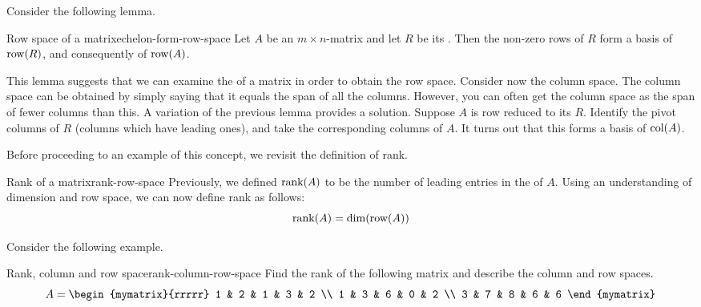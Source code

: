Consider the following lemma. 

\begin{lemma}{Row space of a {\ef} matrix}{echelon-form-row-space}
Let $A$ be an $m \times n$-matrix and let $R$ be its {\ef}. Then the non-zero rows of $R$ form a basis of $\mbox{\rm row}(R)$, and consequently of $\mbox{\rm row}(A)$. 
\end{lemma}

This lemma suggests that we can examine the {\ef} of a matrix in order to obtain the row space. Consider now the column space. The column space can be obtained by simply saying that
it equals the span of all the columns. However, you can often get the column
space as the span of fewer columns than this. A variation of the previous lemma provides a solution. Suppose $A$ is row reduced to its {\ef} $R$. Identify the pivot columns of $R$ (columns which have leading ones), and take the corresponding columns of $A$. It turns out that this forms a basis of $\mbox{\rm col}(A)$. 

Before proceeding to an example of this concept, we revisit the definition of rank. 

\begin{definition}{Rank of a matrix}{rank-row-space}
Previously, we defined $\mbox{\rm rank}(A)$ to be the number of leading entries in the {\ef} of $A$. Using an understanding of dimension and row space, we can now define rank as follows:
\[
\mbox{rank}(A) = \dim(\mbox{\rm row}(A))
\]
\end{definition}

Consider the following example. 

\begin{example}{Rank, column and row space}{rank-column-row-space}
Find the rank of the following matrix and describe the column and row spaces.
\begin{equation*}
A = 
\begin{mymatrix}{rrrrr}
1 & 2 & 1 & 3 & 2 \\
1 & 3 & 6 & 0 & 2 \\
3 & 7 & 8 & 6 & 6
\end{mymatrix}  
\end{equation*}
\end{example}

